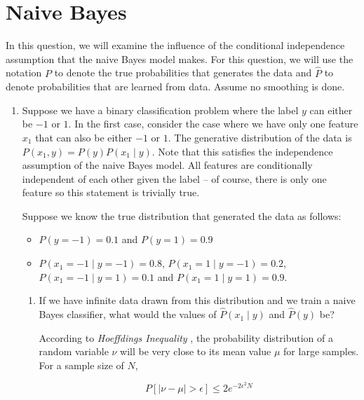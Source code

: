 \section{Naive Bayes}

\newcommand{\ph}{\hat{P}}

In this question, we will examine the influence of the conditional
independence assumption that the naive Bayes model makes. For this
question, we will use the notation $P$ to denote the true
probabilities that generates the data and $\ph$ to denote
probabilities that are learned from data. Assume no smoothing is done.



\begin{enumerate}
\item \relax[Part 1] Suppose we have a binary classification problem
  where the label $y$ can either be $-1$ or $1$. In the first case,
  consider the case where we have only one feature $x_1$ that can also
  be either $-1$ or $1$. The generative distribution of the data is
  $P(x_1, y) = P(y) P(x_1 \mid y)$. Note that this satisfies the
  independence assumption of the naive Bayes model. All features are
  conditionally independent of each other given the label -- of
  course, there is only one feature so this statement is trivially
  true.

  Suppose we know the true distribution that generated the data as
  follows:

  \begin{itemize}
  \item $P(y = -1) = 0.1$ and $P(y = 1) = 0.9$
  \item $P(x_1 = -1 \mid y = -1) = 0.8$, $P(x_1 = 1 \mid y = -1) = 0.2$, $P(x_1 = -1 \mid y = 1) = 0.1$ and $P(x_1 = 1 \mid y = 1) = 0.9$.
  \end{itemize}

  \begin{enumerate}
  \item \relax[2 points] If we have infinite data drawn from this
    distribution and we train a naive Bayes classifier, what would the
    values of $\ph(x_1 \mid y)$ and $\ph(y)$ be?
    
According to \textit{Hoeffdings Inequality} \cite{AMLBook}, the probability distribution of a random variable $\nu$ will be very close to its mean value $\mu$ for large samples. For a sample size of $N$, 

$$
P \left [ |\nu - \mu| > \epsilon \right ] \leq 2 e ^ {-2\epsilon^2N}
$$


\end{enumerate}
\end{enumerate}
